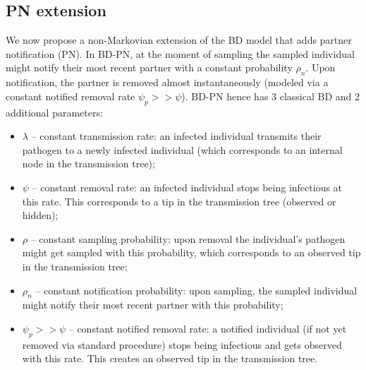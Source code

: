 \documentclass[a4paper,10pt]{article}
\begin{document}
\subsection{PN extension}

We now propose a non-Markovian extension of the BD model that adds partner notification (PN).  In BD-PN, at the moment of sampling the sampled individual might notify their most recent partner with a constant probability $\rho_n$. Upon notification, the partner is removed almost instantaneously (modeled via a constant notified removal rate $\psi_p >> \psi$). BD-PN hence has 3 classical BD and 2 additional parameters:
\begin{itemize}
 \item $\lambda$ -- constant transmission rate: an infected individual transmits their pathogen to a newly infected individual (which corresponds to an internal node in the transmission tree);
 \item $\psi$ -- constant removal rate: an infected individual stops being infectious at this rate. This corresponds to a tip in the transmission tree (observed or hidden);
 \item $\rho$ -- constant sampling probability: upon removal the individual's pathogen might get sampled with this probability, which corresponds to an observed tip in the transmission tree;
 \item $\rho_n$ -- constant notification probability: upon sampling, the sampled individual might notify their most recent partner with this probability;
 \item $\psi_p >> \psi$ -- constant notified removal rate: a notified individual (if not yet removed via standard procedure) stops being infectious and gets observed with this rate. This creates an observed tip in the transmission tree.
\end{itemize}
\end{document}
